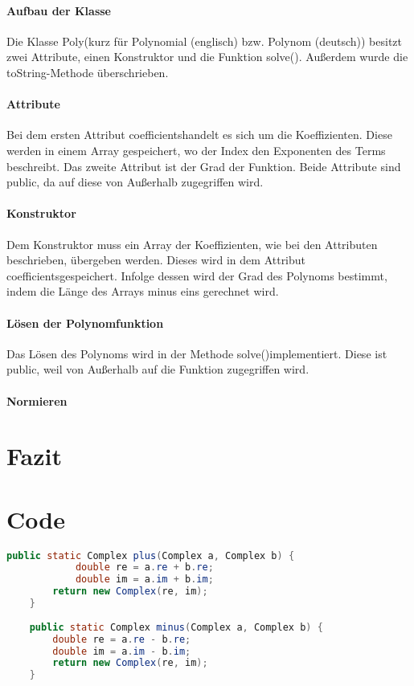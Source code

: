 \documentclass[12pt]{article}
\begin{document}
\paragraph{Aufbau der Klasse}
Die Klasse \glqq Poly\grqq\space (kurz für Polynomial (englisch) bzw. Polynom (deutsch)) besitzt zwei Attribute, einen Konstruktor und die Funktion \glqq solve()\grqq. Außerdem wurde die \glqq toString\grqq -Methode überschrieben.

\paragraph{Attribute}
Bei dem ersten Attribut \glqq coefficients\grqq\space handelt es sich um die Koeffizienten. Diese werden in einem Array gespeichert, wo der Index den Exponenten des Terms beschreibt. Das zweite Attribut ist der Grad der Funktion. Beide Attribute sind \glqq public\grqq, da auf diese von Außerhalb zugegriffen wird.

\paragraph{Konstruktor}
Dem Konstruktor muss ein Array der Koeffizienten, wie bei den Attributen beschrieben, übergeben werden. Dieses wird in dem Attribut \glqq coefficients\grqq\space gespeichert. Infolge dessen wird der Grad des Polynoms bestimmt, indem die Länge des Arrays minus eins gerechnet wird.

\paragraph{Lösen der Polynomfunktion}
Das Lösen des Polynoms wird in der Methode \glqq solve()\grqq\space implementiert. Diese ist \glqq public\grqq, weil von Außerhalb auf die Funktion zugegriffen wird. 

\paragraph{Normieren}

\section{Fazit}

\section{Code}

\begin{lstlisting}[language=Java, title={Complex.java: Z. 19-29}]
    public static Complex plus(Complex a, Complex b) {
            double re = a.re + b.re;
            double im = a.im + b.im;
        return new Complex(re, im);
    }
    
    public static Complex minus(Complex a, Complex b) {
        double re = a.re - b.re;
        double im = a.im - b.im;
        return new Complex(re, im);
    }
    \end{lstlisting}
    
\end{document}
